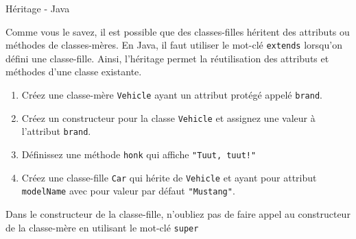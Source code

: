 	
\begin{Exercice}[10 minutes]{Héritage - Java}

	Comme vous le savez, il est possible que des classes-filles héritent des attributs ou méthodes de classes-mères.
	En Java, il faut utiliser le mot-clé \lstinline{extends} lorsqu'on défini une classe-fille. Ainsi, l'héritage permet la réutilisation des attributs et méthodes d'une classe existante.

	\begin{enumerate}
		\item Créez une classe-mère \lstinline{Vehicle} ayant un attribut protégé appelé \lstinline{brand}.
		\item Créez un constructeur pour la classe \lstinline{Vehicle} et assignez une valeur à l'attribut \lstinline{brand}.
		\item Définissez une méthode \lstinline{honk} qui affiche \lstinline{"Tuut, tuut!"}
		\item Créez une classe-fille \lstinline{Car} qui hérite de \lstinline{Vehicle} et ayant pour attribut \lstinline{modelName} avec pour valeur par défaut \lstinline{"Mustang"}.
	\end{enumerate}

	\begin{conseil}
		Dans le constructeur de la classe-fille, n'oubliez pas de faire appel au constructeur de la classe-mère en utilisant le mot-clé \lstinline{super}
	\end{conseil}	
	
	\begin{solution}
		 
	\end{solution}
\end{Exercice}

